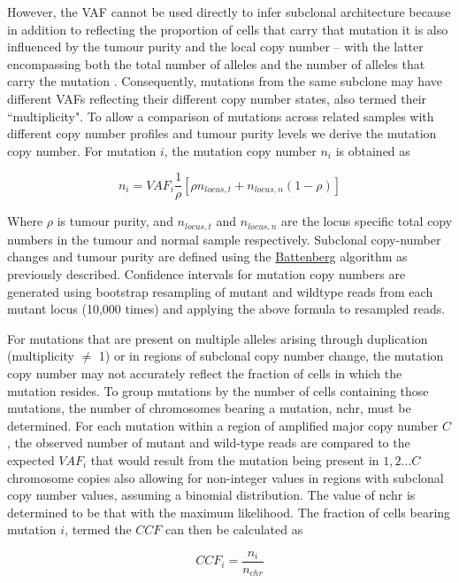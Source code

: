 However, the \ac{VAF} cannot be used directly to infer subclonal architecture because in addition to reflecting the proportion of cells that carry that mutation it is also influenced by the tumour purity and the local copy number – with the latter encompassing both the total number of alleles and the number of alleles that carry the mutation \parencite{Dentro2017-jb}. Consequently, mutations from the same subclone may have different \acp{VAF} reflecting their different copy number states, also termed their ``multiplicity". To allow a comparison of mutations across related samples with different copy number profiles and tumour purity levels we derive the mutation copy number. For mutation $i$, the mutation copy number $n_i$ is obtained as

\begin{equation}
    n_i = VAF_i\frac{1}{\rho}\left[\rho n_{locus,t} + n_{locus,n}(1-\rho)\right]
\end{equation}

Where $\rho$ is tumour purity, and $n_{locus,t}$ and $n_{locus,n}$ are the locus specific total copy numbers in the tumour and normal sample respectively. Subclonal copy-number changes and tumour purity are defined using the \href{https://github.com/cancerit/cgpBattenberg}{Battenberg} algorithm as previously described. Confidence intervals for mutation copy numbers are generated using bootstrap resampling of mutant and wildtype reads from each mutant locus (10,000 times) and applying the above formula to resampled reads. 

For mutations that are present on multiple alleles arising through duplication (multiplicity $\neq$ 1) or in regions of subclonal copy number change, the mutation copy number may not accurately reflect the fraction of cells in which the mutation resides. To group mutations by the number of cells containing those mutations, the number of chromosomes bearing a mutation, nchr, must be determined. For each mutation within a region of amplified major copy number $C$, the observed number of mutant and wild-type reads are compared to the expected $VAF_i$ that would result from the mutation being present in $1, 2 \ldots C$ chromosome copies also allowing for non-integer values in regions with subclonal copy number values, assuming a binomial distribution. The value of nchr is determined to be that with the maximum likelihood. The fraction of cells bearing mutation $i$, termed the $CCF$ can then be calculated as 

\begin{equation}
    CCF_i = \frac{n_i}{n_{chr}}
\end{equation}

